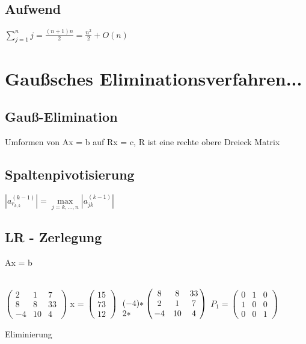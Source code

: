 \documentclass[12pt,a4paper]{article} %
\begin{document}
	\subsection{Aufwend}
	
	$\sum\limits_{j = 1}^nj = \frac{(n + 1)n}{2} = \frac{n^2}{2} + O(n)$
	
	\newpage
	
	\section{Gaußsches Eliminationsverfahren...}
	
	\subsection{Gauß-Elimination}
	
	Umformen von Ax = b auf Rx = c, R ist eine rechte obere Dreieck Matrix
	
	\subsection{Spaltenpivotisierung}
	
	$|a_{r_{k, k}}^{(k - 1)}| = \max\limits_{j = k, ..., n}|a_{jk}^{(k - 1)}|$
	
	\subsection{LR - Zerlegung}
	
	Ax = b
	
	$\begin{pmatrix}
		2 & 1 & 7 \\
		8 & 8 & 33 \\
		-4 & 10 & 4
	\end{pmatrix}$
	x =
	$\begin{pmatrix}
		15 \\
		73 \\
		12
	\end{pmatrix}$
	$\bordermatrix{ ~ & & & \cr
		 & 8 & 8 & 33 \cr
		(-4) * & 2 & 1 & 7 \cr
		2 * & -4 & 10 & 4
	}$
	$P_1 = \begin{pmatrix}
		0 & 1 & 0 \\
		1 & 0 & 0 \\
		0 & 0 & 1
	\end{pmatrix}$
	
	Eliminierung
	
\end{document}
